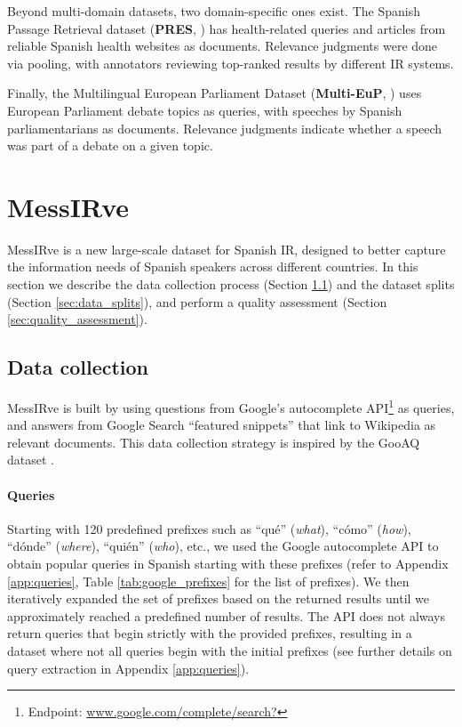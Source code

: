 \documentclass[11pt]{article}
\begin{document}
Beyond multi-domain datasets, two domain-specific ones exist. The Spanish Passage Retrieval dataset (\textbf{PRES}, \citealp{kamateri2019test}) has health-related queries and articles from reliable Spanish health websites as documents. Relevance judgments were done via pooling, with annotators reviewing top-ranked results by different IR systems.

Finally, the Multilingual European Parliament Dataset (\textbf{Multi-EuP}, \citealp{yang-etal-2023-multi-eup}) uses European Parliament debate topics as queries, with speeches by Spanish parliamentarians as documents. Relevance judgments indicate whether a speech was part of a debate on a given topic.



\section{MessIRve} \label{sec:dataset}

MessIRve is a new large-scale dataset for Spanish IR, designed to better capture the information needs of Spanish speakers across different countries. In this section we describe the data collection process (Section \ref{sec:data_collection}) and the dataset splits (Section \ref{sec:data_splits}), and perform a quality assessment (Section \ref{sec:quality_assessment}).

\subsection{Data collection} \label{sec:data_collection}

MessIRve is built by using questions from Google's autocomplete API\footnote{Endpoint: \url{www.google.com/complete/search?}} as queries, and answers from Google Search ``featured snippets'' that link to Wikipedia as relevant documents. This data collection strategy is inspired by the GooAQ dataset \citep{khashabi-etal-2021-gooaq-open}.

\paragraph{Queries} Starting with 120 predefined prefixes such as ``qué'' (\emph{what}), ``cómo'' (\emph{how}), ``dónde'' (\emph{where}), ``quién'' (\emph{who}), etc., we used the Google autocomplete API to obtain popular queries in Spanish starting with these prefixes (refer to Appendix \ref{app:queries}, Table \ref{tab:google_prefixes} for the list of prefixes). We then iteratively expanded the set of prefixes based on the returned results until we approximately reached a predefined number of results. The API does not always return queries that begin strictly with the provided prefixes, resulting in a dataset where not all queries begin with the initial prefixes (see further details on query extraction in Appendix \ref{app:queries}).
\end{document}
